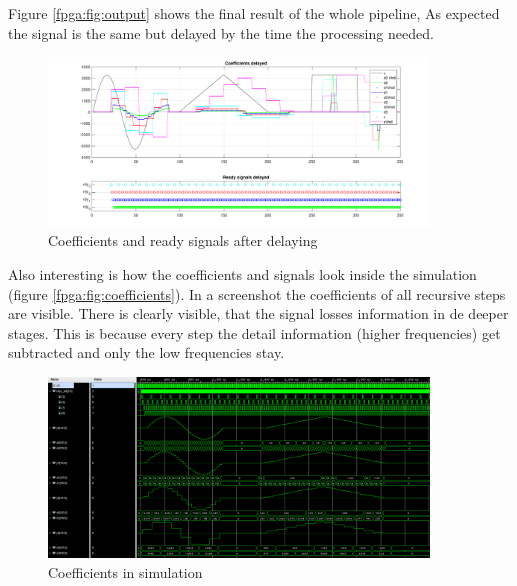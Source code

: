 \begin{refsection}
Figure \ref{fpga:fig:output} shows the final result of the whole pipeline, As expected the signal is the same but delayed by the time the processing needed. 
\begin{figure}[h]
	\centering
	\includegraphics[width=0.9\textwidth]{papers/fpga/images/coefs_delayed.pdf}
	\caption{Coefficients and ready signals after delaying \label{fpga:fig:coeff_delayed}}
\end{figure}

Also interesting is how the coefficients and signals look inside the simulation (figure \ref{fpga:fig:coefficients}). 
In a screenshot the coefficients of all recursive steps are visible. 
There is clearly visible, that the signal losses information in de deeper stages. 
This is because every step the detail information (higher frequencies) get subtracted and only the low frequencies stay.

\begin{figure}[h]
	\centering
	\includegraphics[width=0.9\textwidth]{papers/fpga/images/inv_branching_screenshot.png}
	\caption{Coefficients in simulation \label{fpga:fig:sim}}
\end{figure}

\newpage


\end{refsection}
